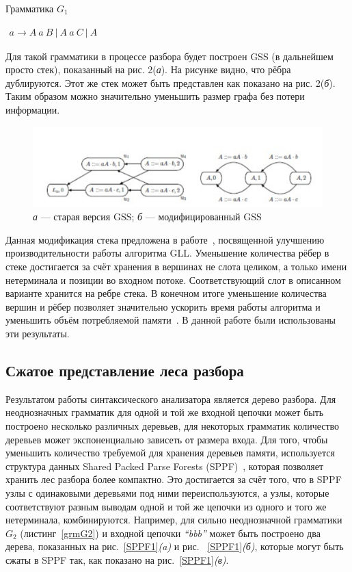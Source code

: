 \begin{listing}
\caption{Грамматика $G_1$}
\label{grmG1}
\centering
$\begin{array}{rl}
a \rightarrow A \ a \ B \ | \ A \ a \ C \ | \ A
\end{array}$

\end{listing}
Для такой грамматики в процессе разбора будет построен GSS (в дальнейшем просто стек), показанный на рис. 2({\it а}). На рисунке видно, что рёбра дублируются. Этот же стек может быть представлен как показано на рис. 2({\it б}). Таким образом можно значительно уменьшить размер графа без потери информации. 

\begin{figure}
 \centering
 \includegraphics[width=\textwidth]{Ragozina/pics/GSSNew.pdf}
 \caption{{\it а} --- старая версия GSS;  {\it б} --- модифицированный GSS }
 \label{GSS2}
\end{figure}

Данная модификация стека предложена в работе~\cite{Afroozeh2015}, посвященной улучшению производительности работы алгоритма GLL. Уменьшение количества рёбер в стеке достигается за счёт хранения в вершинах не слота целиком, а только имени нетерминала и позиции во входном потоке. Соответствующий слот в описанном варианте хранится на ребре стека. В конечном итоге уменьшение количества вершин и рёбер позволяет значительно ускорить время работы алгоритма и уменьшить объём потребляемой памяти~\cite{Afroozeh2015}. В данной работе были использованы эти результаты.

\subsection{Сжатое представление леса разбора}
Результатом работы синтаксического анализатора является дерево разбора. Для неоднозначных грамматик для одной и той же входной цепочки может быть построено несколько различных деревьев, для некоторых грамматик количество деревьев может экспоненциально зависеть от размера входа. Для того, чтобы уменьшить количество требуемой для хранения деревьев памяти, используется структура данных Shared Packed Parse Forests (SPPF)~\cite{SPPF}, которая позволяет хранить лес разбора более компактно. Это достигается за счёт того, что в SPPF узлы с одинаковыми деревьями под ними переиспользуются, а узлы, которые соответствуют разным выводам одной и той же цепочки из одного и того же нетерминала, комбинируются. Например, для сильно неоднозначной грамматики $G_2$ (листинг~\ref{grmG2}) и входной цепочки  {\it ``bbb''} может быть построено два дерева, показанных на рис.~\ref{SPPF1}{\it (a)} и рис. ~\ref{SPPF1}{\it (б)}, которые могут быть сжаты в SPPF так, как показано на рис.~\ref{SPPF1}{\it (в)}.

